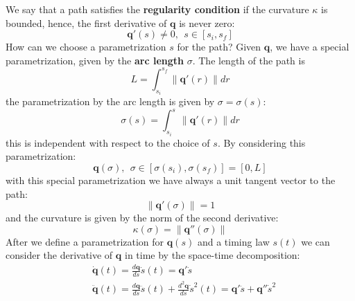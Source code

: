 \documentclass[10pt, letterpaper]{report}
\begin{document}
We say that a path satisfies the \textbf{regularity condition} if the curvature $\kappa$ is bounded, hence, the first derivative of $\mathbf q$ is never zero:\begin{equation}
    \mathbf q'(s)\ne 0, \ \ s\in[s_i,s_f]
\end{equation}
How can we choose a parametrization $s$ for the path? Given $\mathbf q$, we have a special parametrization, given by the \textbf{arc length} $\sigma$. The length of the path is\begin{equation}
    L=\int_{s_i}^{s_f}\|\mathbf q'(r)\|dr
\end{equation}
the parametrization by the arc length is given by $\sigma=\sigma(s)$:\begin{equation}
    \sigma(s)=\int_{s_i}^{s}\|\mathbf q'(r)\|dr
\end{equation}
this is independent with respect to the choice of $s$. By considering this parametrization:\begin{equation}
    \mathbf q(\sigma), \ \ \sigma\in[\sigma(s_i),\sigma(s_f)]=[0,L]
\end{equation}
with this special parametrization we have always a unit tangent vector to the path:\begin{equation}
    \|\mathbf q'(\sigma)\|=1
\end{equation}
and the curvature is given by the norm of the second derivative:\begin{equation}
    \kappa(\sigma)=\|\mathbf q''(\sigma)\|
\end{equation}
After we define a parametrization for $\mathbf q(s)$ and a timing law $s(t)$ we can consider the derivative of $\mathbf q$ in time by the space-time decomposition:\begin{align}
    &\dot{\mathbf q}(t)=\frac{d\mathbf q}{ds}\dot s(t)=\mathbf q'\dot s\\ 
    &\ddot{\mathbf q}(t)=\frac{d\mathbf q}{ds}\ddot s(t)+\frac{d^2\mathbf q}{ds}\dot s^2(t)=
    \mathbf q'\ddot s+\mathbf q''\dot s^2
\end{align} 
\end{document}
